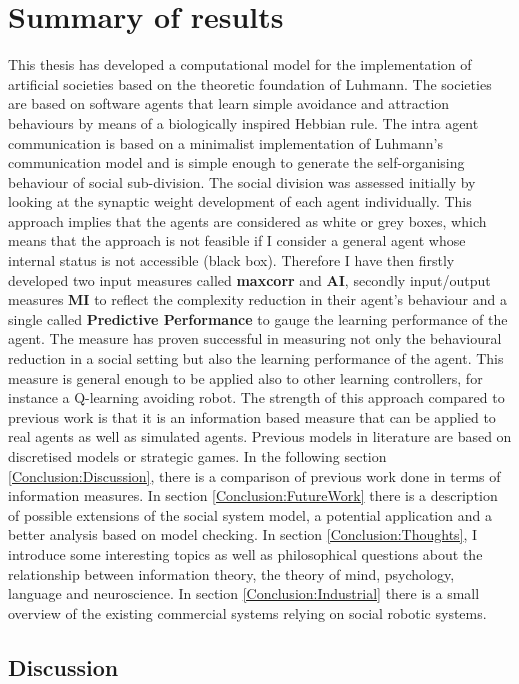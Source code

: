 \section{Summary of results}
This thesis has developed a computational model for the implementation
of artificial societies based on the theoretic foundation of Luhmann.
The societies are based on software agents that learn simple avoidance
and attraction behaviours by means of a biologically inspired Hebbian rule.
The intra agent communication is based on a minimalist implementation
of Luhmann's communication model and is simple enough to generate the self-organising
behaviour of social sub-division.
The social division was assessed initially by looking at the synaptic weight development
of each agent individually.
This approach implies that the agents are considered as white or grey boxes, which
means that the approach is not feasible if I consider a general agent whose
internal status is not accessible (black box).
Therefore I have then firstly developed two input measures called \textbf{maxcorr} and \textbf{AI},
secondly input/output measures \textbf{MI} to reflect the complexity reduction
in their agent's behaviour and a single called \textbf{Predictive Performance} to gauge the learning 
performance of the agent.
The measure has proven successful in measuring not only the behavioural reduction in
a social setting but also the learning performance of the agent.
This measure is general enough to be applied also to other learning controllers,
for instance a Q-learning avoiding robot.
The strength of this approach compared to previous work is that it is
an information based measure that can be applied to real agents
as well as simulated agents.
Previous models in literature are based on discretised models or strategic games.
In the following section \ref{Conclusion:Discussion}, there is a comparison of previous work done in terms of information measures.
In section \ref{Conclusion:FutureWork} there is a description of possible extensions 
of the social system model, a potential application and a better analysis based on
model checking.
In section \ref{Conclusion:Thoughts}, I introduce some interesting topics as well as philosophical
questions about the relationship between information theory, the theory of mind,
psychology, language and neuroscience.
In section \ref{Conclusion:Industrial} there is a small overview of the existing
commercial systems relying on social robotic systems.

\subsection{Discussion \label{Conclusion:Discussion}}

